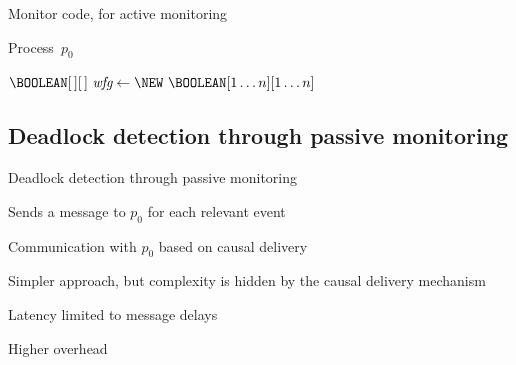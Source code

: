 \begin{frame}{Monitor code, for active monitoring}
	
\begin{Procedure}
\caption{Process\ $p_0$}
  $\BOOLEAN[\,][\,]\ \Wfg \gets \NEW\ \BOOLEAN[1 \ldots n][1 \ldots n]$\;
\end{Procedure}

\end{frame}

\subsection{Deadlock detection through passive monitoring}

\begin{frame}{Deadlock detection through passive monitoring}

\BI
\item Sends a message to $p_0$ for each relevant event
\item Communication with $p_0$ based on causal delivery
\EI

\bigskip
{}
\BI
\item Simpler approach, but complexity is hidden by the
  causal delivery mechanism
\item Latency limited to message delays
\item Higher overhead
\EI


\end{frame}


